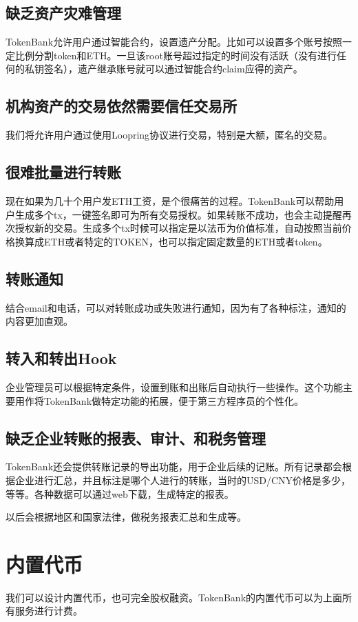 \documentclass[UTF8,nofonts]{ctexart}
\begin{document}
\subsection{缺乏资产灾难管理}

TokenBank允许用户通过智能合约，设置遗产分配。比如可以设置多个账号按照一定比例分割token和ETH。一旦该root账号超过指定的时间没有活跃（没有进行任何的私钥签名），遗产继承账号就可以通过智能合约claim应得的资产。

\subsection{机构资产的交易依然需要信任交易所}
我们将允许用户通过使用Loopring协议进行交易，特别是大额，匿名的交易。

\subsection{很难批量进行转账}

现在如果为几十个用户发ETH工资，是个很痛苦的过程。TokenBank可以帮助用户生成多个tx，一键签名即可为所有交易授权。如果转账不成功，也会主动提醒再次授权新的交易。生成多个tx时候可以指定是以法币为价值标准，自动按照当前价格换算成ETH或者特定的TOKEN，也可以指定固定数量的ETH或者token。

\subsection{转账通知}
结合email和电话，可以对转账成功或失败进行通知，因为有了各种标注，通知的内容更加直观。

\subsection{转入和转出Hook}
企业管理员可以根据特定条件，设置到账和出账后自动执行一些操作。这个功能主要用作将TokenBank做特定功能的拓展，便于第三方程序员的个性化。

\subsection{缺乏企业转账的报表、审计、和税务管理}

TokenBank还会提供转账记录的导出功能，用于企业后续的记账。所有记录都会根据企业进行汇总，并且标注是哪个人进行的转账，当时的USD/CNY价格是多少，等等。各种数据可以通过web下载，生成特定的报表。

以后会根据地区和国家法律，做税务报表汇总和生成等。

\section{内置代币}

我们可以设计内置代币，也可完全股权融资。TokenBank的内置代币可以为上面所有服务进行计费。
\end{document}

